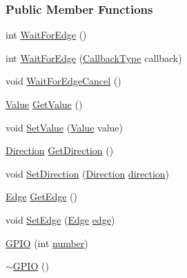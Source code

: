 \subsubsection*{Public Member Functions}
\begin{DoxyCompactItemize}
\item 
int \hyperlink{class_hardware_1_1_g_p_i_o_afd1340f1a1907168e7dc4ad24027b96a}{Wait\+For\+Edge} ()
\item 
int \hyperlink{class_hardware_1_1_g_p_i_o_a68cce8d2f123100a2806b32958f6b719}{Wait\+For\+Edge} (\hyperlink{namespace_hardware_a5ba2e4bdfa2bbd8b551b1d5b2a0c61fd}{Callback\+Type} callback)
\item 
void \hyperlink{class_hardware_1_1_g_p_i_o_a9b16b6ac156b20d979e92244d0b05c63}{Wait\+For\+Edge\+Cancel} ()
\item 
\hyperlink{class_hardware_1_1_g_p_i_o_ad357201dc1ad13ad96ba1773108a5f6d}{Value} \hyperlink{class_hardware_1_1_g_p_i_o_a7bb00a19893d4cc5432d81fc306223ac}{Get\+Value} ()
\item 
void \hyperlink{class_hardware_1_1_g_p_i_o_a2564893797de6a2dab596c4fc990b919}{Set\+Value} (\hyperlink{class_hardware_1_1_g_p_i_o_ad357201dc1ad13ad96ba1773108a5f6d}{Value} value)
\item 
\hyperlink{class_hardware_1_1_g_p_i_o_a7507431d6341c146f22dcdb21b78ffd4}{Direction} \hyperlink{class_hardware_1_1_g_p_i_o_a410f58faf97368fc9a1d76f3b44afbcb}{Get\+Direction} ()
\item 
void \hyperlink{class_hardware_1_1_g_p_i_o_a4a9fc2f7be304a6b23c2a2876b4c6bf9}{Set\+Direction} (\hyperlink{class_hardware_1_1_g_p_i_o_a7507431d6341c146f22dcdb21b78ffd4}{Direction} \hyperlink{class_hardware_1_1_g_p_i_o_a77e93e4f6650507fdc4898d272d540e7}{direction})
\item 
\hyperlink{class_hardware_1_1_g_p_i_o_a9a7595aabdac9aec75f22e8b86342162}{Edge} \hyperlink{class_hardware_1_1_g_p_i_o_a081393bd50e4b1a7830764e0772c4cba}{Get\+Edge} ()
\item 
void \hyperlink{class_hardware_1_1_g_p_i_o_a4d4ab3b0f1ee53590a300bfbcccae895}{Set\+Edge} (\hyperlink{class_hardware_1_1_g_p_i_o_a9a7595aabdac9aec75f22e8b86342162}{Edge} \hyperlink{class_hardware_1_1_g_p_i_o_adf15f74f053069029e99934e28c109e0}{edge})
\item 
\hyperlink{class_hardware_1_1_g_p_i_o_afa29c38f1b07c2db68572ac0c60ed787}{G\+P\+I\+O} (int \hyperlink{class_hardware_1_1_g_p_i_o_a1671a87bb70911b0a6a29019a068cf96}{number})
\item 
\hyperlink{class_hardware_1_1_g_p_i_o_a4a32391de40411d1aa5c49206cacc06d}{$\sim$\+G\+P\+I\+O} ()
\end{DoxyCompactItemize}
